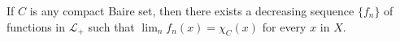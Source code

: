 If $C$ is any compact Baire set, then there exists a decreasing sequence $\{f_n\}$ of functions in $\mathcal{L}_+$ such that $\lim_n f_n(x) = \chi_C(x)$ for every $x$ in $X$.
